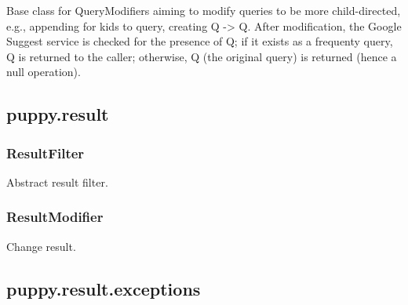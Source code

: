 \documentclass[letterpaper,10pt,english]{sphinxmanual}
\begin{document}
\begin{fulllineitems}
Base class for QueryModifiers aiming to modify queries to be more
child-directed, e.g., appending for kids to query, creating Q -\textgreater{} Q.
After modification, the Google Suggest service is checked for the
presence of Q; if it exists as a frequenty query, Q is returned to
the caller; otherwise, Q (the original query) is returned (hence a null
operation).

\end{fulllineitems}



\subsection{puppy.result}
\label{api2.0:puppy-result}\label{api2.0:module-puppy.result}

\subsubsection{ResultFilter}
\label{api2.0:resultfilter}

\begin{fulllineitems}
\label{api2.0:puppy.result.ResultFilter}
Abstract result filter.

\end{fulllineitems}



\subsubsection{ResultModifier}
\label{api2.0:resultmodifier}

\begin{fulllineitems}
\label{api2.0:puppy.result.ResultModifier}
Change result.

\end{fulllineitems}



\subsection{puppy.result.exceptions}
\label{api2.0:puppy-result-exceptions}\label{api2.0:module-puppy.result.exceptions}
\end{document}
